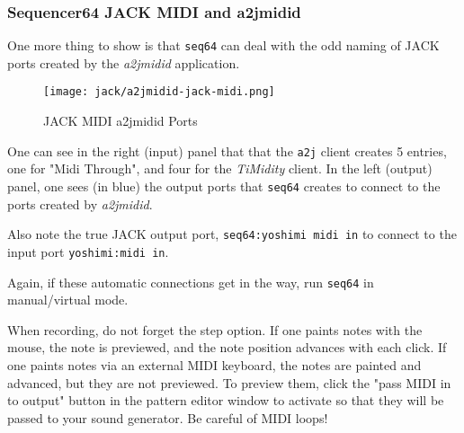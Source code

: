 \subsubsection{Sequencer64 JACK MIDI and a2jmidid}
\label{subsubsec:seq64_jack_midi_a2jmidid}

   One more thing to show is that \texttt{seq64} can deal with the odd naming
   of JACK ports created by the \textsl{a2jmidid} application.

\begin{figure}[H]
   \centering 
   \texttt{[image: jack/a2jmidid-jack-midi.png]}
   \caption{JACK MIDI a2jmidid Ports}
   \label{fig:seq64_a2jmidid_jack_midi}
\end{figure}

   One can see in the right (input) panel that that the \texttt{a2j} client
   creates 5 entries, one for "Midi Through", and four for the
   \textsl{TiMidity} client.
   In the left (output) panel, one sees (in blue) the output
   ports that \texttt{seq64} creates to connect to the ports created by
   \textsl{a2jmidid}.

   Also note the true JACK output port,
   \texttt{seq64:yoshimi midi in} to connect to the input port
   \texttt{yoshimi:midi in}.

   Again, if these automatic connections get in the way, run \texttt{seq64} in
   manual/virtual mode.

   When recording, do not forget the step option.  If one paints notes with the
   mouse, the note is previewed, and the note position advances with each
   click.  If one paints notes via an external MIDI keyboard, the notes are
   painted and advanced, but they are not previewed.  To preview them, click
   the "pass MIDI in to output" button in the pattern editor window to activate
   so that they will be passed to your sound generator.
	Be careful of MIDI loops!


